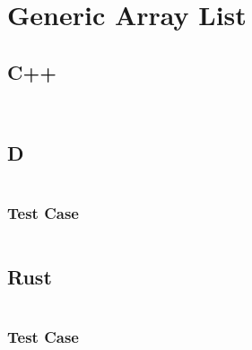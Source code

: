 \documentclass[finalcopy]{srpaper}
\begin{document}
\section{Generic Array List}
\subsection{C++}
\begin{mdframed}[linecolor=black]
\inputminted[fontsize=\scriptsize]{cpp}{../examples/generic-array-list/generic_array_list.hpp}
\end{mdframed}

\begin{mdframed}[linecolor=black]
\inputminted[fontsize=\scriptsize]{cpp}{../examples/generic-array-list/generic_array_list.cpp}
\end{mdframed}

\subsection{D}
\begin{mdframed}[linecolor=black]
\inputminted[fontsize=\scriptsize]{d}{../examples/generic-array-list/generic_array_list.d}
\end{mdframed}

\subsubsection{Test Case}
\begin{mdframed}[linecolor=black]
\inputminted[fontsize=\scriptsize]{d}{../examples/generic-array-list/tests/generic_array_list_test.d}
\end{mdframed}

\subsection{Rust}
\begin{mdframed}[linecolor=black]
\inputminted[fontsize=\scriptsize]{rust}{../examples/generic-array-list/generic_array_list.rs}
\end{mdframed}

\subsubsection{Test Case}
\begin{mdframed}[linecolor=black]
\inputminted[fontsize=\scriptsize]{rust}{../examples/generic-array-list/tests/generic-array-list-test.rs}
\end{mdframed}
\end{document}
